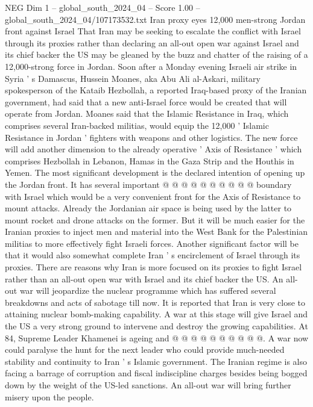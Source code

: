 \begin{textsample}{NEG Dim 1 – global\_south\_2024\_04 – Score 1.00 – global\_south\_2024\_04/107173532.txt}  \label{ex:f1_neg_307}
Iran proxy eyes 12,000 men-strong Jordan front against Israel That Iran may be seeking to escalate the conflict with Israel through its proxies rather than declaring an all-out open war against Israel and its chief backer the US may be gleaned by the buzz and chatter of the raising of a 12,000-strong force in Jordan.
Soon after a Monday evening Israeli air strike in Syria ' s Damascus, Hussein Moanes, aka Abu Ali al-Askari, military spokesperson of the Kataib Hezbollah, a reported Iraq-based proxy of the Iranian government, had said that a new anti-Israel force would be created that will operate from Jordan.
Moanes said that the Islamic Resistance in Iraq, which comprises several Iran-backed militias, would equip the 12,000 ' Islamic Resistance in Jordan ' fighters with weapons and other logistics.
The new force will add another dimension to the already operative ' Axis of Resistance ' which comprises Hezbollah in Lebanon, Hamas in the Gaza Strip and the Houthis in Yemen.
The most significant development is the declared intention of opening up the Jordan front.
It has several important @ @ @ @ @ @ @ @ @ @ boundary with Israel which would be a very convenient front for the Axis of Resistance to mount attacks.
Already the Jordanian air space is being used by the latter to mount rocket and drone attacks on the former.
But it will be much easier for the Iranian proxies to inject men and material into the West Bank for the Palestinian militias to more effectively fight Israeli forces.
Another significant factor will be that it would also somewhat complete Iran ' s encirclement of Israel through its proxies.
There are reasons why Iran is more focused on its proxies to fight Israel rather than an all-out open war with Israel and its chief backer the US.
An all-out war will jeopardize the nuclear programme which has suffered several breakdowns and acts of sabotage till now.
It is reported that Iran is very close to attaining nuclear bomb-making capability.
A war at this stage will give Israel and the US a very strong ground to intervene and destroy the growing capabilities.
At 84, Supreme Leader Khamenei is ageing and @ @ @ @ @ @ @ @ @ @.
A war now could paralyse the hunt for the next leader who could provide much-needed stability and continuity to Iran ' s Islamic government.
The Iranian regime is also facing a barrage of corruption and fiscal indiscipline charges besides being bogged down by the weight of the US-led sanctions.
An all-out war will bring further misery upon the people.

\end{textsample}
